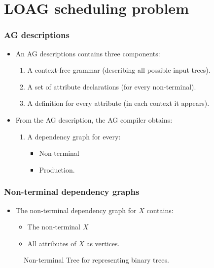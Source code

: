 \documentclass{beamer}
\begin{document}
\section{LOAG scheduling problem}
\begin{frame}
    \frametitle{AG descriptions}
    \begin{itemize}
        \item An AG descriptions contains three components:
        \begin{enumerate}
            \item A context-free grammar (describing all possible input trees).
            \item A set of attribute declarations (for every non-terminal).
            \item A definition for every attribute (in each context it appears).
        \end{enumerate}
        \item From the AG description, the AG compiler obtains:
        \begin{enumerate}
            \item A dependency graph for every:
                \begin{itemize} 
                    \item Non-terminal
                    \item Production.
                \end{itemize}
        \end{enumerate}
    \end{itemize}
\end{frame}

\begin{frame}
    \frametitle{Non-terminal dependency graphs}
    \begin{itemize}
        \item The non-terminal dependency graph for $X$ contains:
            \begin{itemize}
                \item The non-terminal $X$ 
                \item All attributes of $X$ as vertices.
            \end{itemize}
    \end{itemize}
    \begin{figure}
    \caption{Non-terminal Tree for representing binary trees.}
    \end{figure}
\end{frame}
\end{document}
